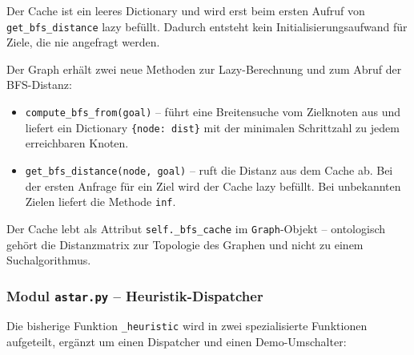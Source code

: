

Der Cache ist ein leeres Dictionary und wird erst beim ersten Aufruf von \texttt{get\_bfs\_distance} lazy befüllt. Dadurch entsteht kein Initialisierungsaufwand für Ziele, die nie angefragt werden.

Der Graph erhält zwei neue Methoden zur Lazy-Berechnung und zum Abruf der \acs{BFS}-Distanz:



\begin{itemize}
    \item \texttt{compute\_bfs\_from(goal)} -- führt eine Breitensuche vom Zielknoten aus und liefert ein Dictionary \texttt{\{node: dist\}} mit der minimalen Schrittzahl zu jedem erreichbaren Knoten.
    \item \texttt{get\_bfs\_distance(node, goal)} -- ruft die Distanz aus dem Cache ab. Bei der ersten Anfrage für ein Ziel wird der Cache lazy befüllt. Bei unbekannten Zielen liefert die Methode \texttt{inf}.
\end{itemize}

Der Cache lebt als Attribut \texttt{self.\_bfs\_cache} im \texttt{Graph}-Objekt -- ontologisch gehört die Distanzmatrix zur Topologie des Graphen und nicht zu einem Suchalgorithmus.


\subsubsection{Modul \texttt{astar.py} – Heuristik-Dispatcher}

Die bisherige Funktion \texttt{\_heuristic} wird in zwei spezialisierte Funktionen aufgeteilt, ergänzt um einen Dispatcher und einen Demo-Umschalter:



